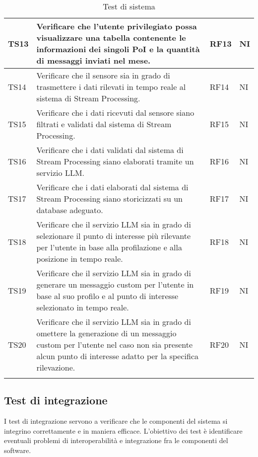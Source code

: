 \documentclass[10pt]{article}
\begin{document}
\begin{justify}
\begin{longtable}{|>{\centering\arraybackslash}m{2cm}|>{\centering\arraybackslash}m{7cm}|>{\centering\arraybackslash}m{2cm}|>{\centering\arraybackslash}m{2cm}|}
\hline
TS13 & Verificare che l'utente privilegiato possa visualizzare una tabella contenente le informazioni dei singoli PoI e la quantità di messaggi inviati nel mese. & RF13 & NI\\
\hline
TS14 & Verificare che il sensore sia in grado di trasmettere i dati rilevati in tempo reale al sistema di Stream Processing. & RF14 & NI\\
\hline
TS15 & Verificare che i dati ricevuti dal sensore siano filtrati e validati dal sistema di Stream Processing. & RF15 & NI\\
\hline
TS16 & Verificare che i dati validati dal sistema di Stream Processing siano elaborati tramite un servizio LLM. & RF16 & NI\\
\hline
TS17 & Verificare che i dati elaborati dal sistema di Stream Processing siano storicizzati su un database adeguato. & RF17 & NI\\
\hline
TS18 & Verificare che il servizio LLM sia in grado di selezionare il punto di interesse più rilevante per l'utente in base alla profilazione e alla posizione in tempo reale. & RF18 & NI\\
\hline
TS19 & Verificare che il servizio LLM sia in grado di generare un messaggio custom per l'utente in base al suo profilo e al punto di interesse selezionato in tempo reale. & RF19 & NI\\
\hline
TS20 & Verificare che il servizio LLM sia in grado di omettere la generazione di un messaggio custom per l'utente nel caso non sia presente alcun punto di interesse adatto per la specifica rilevazione. & RF20 & NI\\
\hline
\caption{Test di sistema}\\
\end{longtable}

\subsection{Test di integrazione}
I test di integrazione servono a verificare che le componenti del sistema si integrino correttamente e in maniera efficace. L'obiettivo dei test
è identificare eventuali problemi di interoperabilità e integrazione fra le componenti del software.\\


\end{justify}
\end{document}
